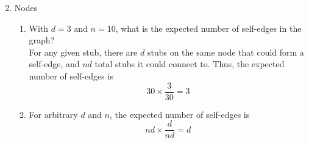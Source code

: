 \documentclass{article}
\begin{document}
\begin{enumerate}
\begin{enumerate}[label=\arabic*.]
\begin{equation*}
                    \end{equation*}
          \end{enumerate}
    \item Nodes
          \begin{enumerate}[label=\arabic*.]
              \item With \(d = 3 \text{ and } n = 10\), what is the expected number of self-edges in the graph? \\
                    For any given stub, there are \(d\) stubs on the same node that could form a self-edge,
                    and \(nd\) total stubs it could connect to. Thus, the expected number of self-edges is
                    \begin{equation*}
                        30 \times \frac{3}{30} = 3
                    \end{equation*}
              \item For arbitrary \(d\) and \(n\), the expected number of self-edges is
                    \begin{equation*}
                        nd \times \frac{d}{nd} = d
                    \end{equation*}
          \end{enumerate}
\end{enumerate}
\end{document}
